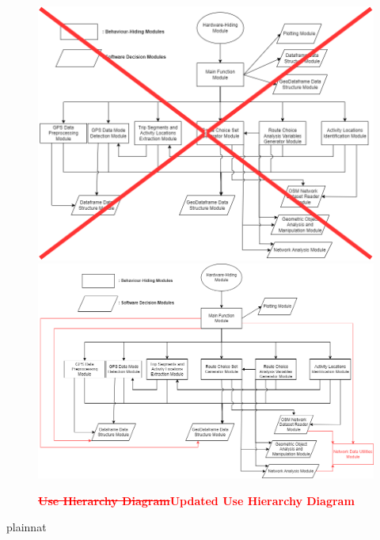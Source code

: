 \documentclass[12pt, titlepage]{article}
\begin{document}
\begin{figure}[H]
\centering
 \centering
\includegraphics[scale=0.40]{Use_Hierarchy_old.png}
\includegraphics[scale=0.50]{Use_Hierarchy_new.png}
\caption{\bf \textcolor{red}{\sout{Use Hierarchy Diagram}Updated Use Hierarchy Diagram}}
\label{fig:UH}
\end{figure}

\newpage
 {plainnat}
% 


\newpage{}
\end{document}
